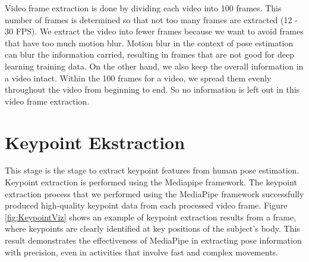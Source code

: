 Video frame extraction is done by dividing each video into 100 frames. This number of frames is determined so that not too many frames are extracted (12 - 30 FPS). We extract the video into fewer frames because we want to avoid frames that have too much motion blur. Motion blur in the context of pose estimation can blur the information carried, resulting in frames that are not good for deep learning training data. On the other hand, we also keep the overall information in a video intact. Within the 100 frames for a video, we spread them evenly throughout the video from beginning to end. So no information is left out in this video frame extraction.

\section{Keypoint Ekstraction}
\label{sec4:KeypointExtraction}
This stage is the stage to extract keypoint features from human pose estimation. Keypoint extraction is performed using the Mediapipe framework. The keypoint extraction process that we performed using the MediaPipe framework successfully produced high-quality keypoint data from each processed video frame. Figure \ref{fig:KeypointViz} shows an example of keypoint extraction results from a frame, where keypoints are clearly identified at key positions of the subject's body. This result demonstrates the effectiveness of MediaPipe in extracting pose information with precision, even in activities that involve fast and complex movements.

